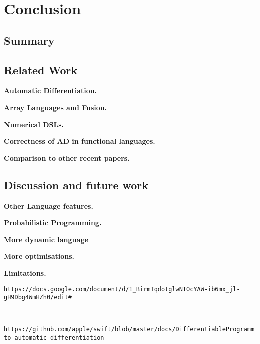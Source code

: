\section{Conclusion}

\subsection{Summary} %
\label{sub:summary}

\subsection{Related Work} %
\label{sub:related_work}

\noindent \textbf{Automatic Differentiation.} 

\noindent \textbf{Array Languages and Fusion.}

\noindent \textbf{Numerical DSLs.} 

\noindent \textbf{Correctness of AD in functional languages.}

\noindent \textbf{Comparison to other recent papers.}

\subsection{Discussion and future work} %
\label{sub:discussion_and_future_work}

\noindent \textbf{Other Language features.}

\noindent \textbf{Probabilistic Programming.}

\noindent \textbf{More dynamic language}

\noindent \textbf{More optimisations.}

\noindent \textbf{Limitations.}


\begin{verbatim}https://docs.google.com/document/d/1_BirmTqdotglwNTOcYAW-ib6mx_jl-gH9Dbg4WmHZh0/edit# \end{verbatim}
\begin{verbatim}

	https://github.com/apple/swift/blob/master/docs/DifferentiableProgramming.md#approaches-to-automatic-differentiation
\end{verbatim}


\clearpage